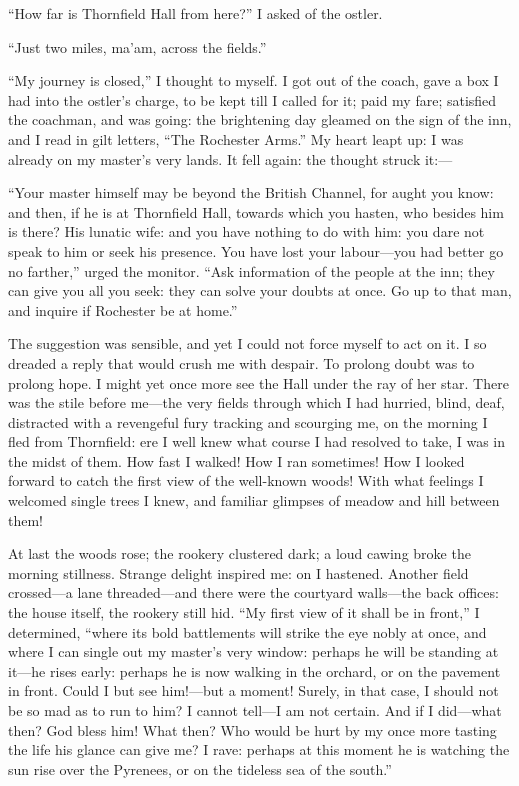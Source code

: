 \enquote{How far is Thornfield Hall from here?} I asked of the ostler.

\enquote{Just two miles, ma'am, across the fields.}

\enquote{My journey is closed,} I thought to myself. I got out of the
coach, gave a box I had into the ostler's charge, to be kept till I
called for it; paid my fare; satisfied the coachman, and was going: the
brightening day gleamed on the sign of the inn, and I read in gilt
letters, \enquote{The Rochester Arms.} My heart leapt up: I was already
on my master's very lands. It fell again: the thought struck it:---

\enquote{Your master himself may be beyond the British Channel, for
	aught you know: and then, if he is at Thornfield Hall, towards which you
	hasten, who besides him is there? His lunatic wife: and you have
	nothing to do with him: you dare not speak to him or seek his presence.
	You have lost your labour---you had better go no farther,} urged the
monitor. \enquote{Ask information of the people at the inn; they can
	give you all you seek: they can solve your doubts at once. Go up to
	that man, and inquire if \Mr{} Rochester be at home.}

The suggestion was sensible, and yet I could not force myself to act on
it. I so dreaded a reply that would crush me with despair. To prolong
doubt was to prolong hope. I might yet once more see the Hall under the
ray of her star. There was the stile before me---the very fields
through which I had hurried, blind, deaf, distracted with a revengeful
fury tracking and scourging me, on the morning I fled from Thornfield:
ere I well knew what course I had resolved to take, I was in the midst
of them. How fast I walked! How I ran sometimes! How I looked forward
to catch the first view of the well-known woods! With what feelings I
welcomed single trees I knew, and familiar glimpses of meadow and hill
between them!

At last the woods rose; the rookery clustered dark; a loud cawing broke
the morning stillness. Strange delight inspired me: on I hastened.
Another field crossed---a lane threaded---and there were the courtyard
walls---the back offices: the house itself, the rookery still hid.
\enquote{My first view of it shall be in front,} I determined,
\enquote{where its bold battlements will strike the eye nobly at once,
	and where I can single out my master's very window: perhaps he will be
	standing at it---he rises early: perhaps he is now walking in the
	orchard, or on the pavement in front. Could I but see him!---but a
	moment! Surely, in that case, I should not be so mad as to run to him?
	I cannot tell---I am not certain. And if I did---what then? God bless
	him! What then? Who would be hurt by my once more tasting the life his
	glance can give me? I rave: perhaps at this moment he is watching the
	sun rise over the Pyrenees, or on the tideless sea of the south.}

